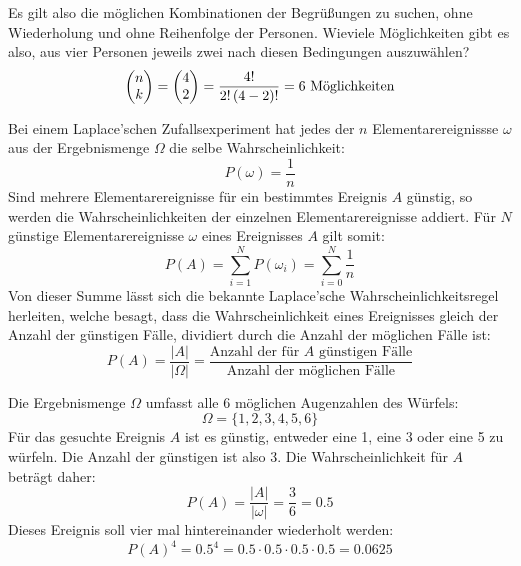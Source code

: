 Es gilt also die m\"{o}glichen Kombinationen der Begr\"{u}\ss{}ungen zu suchen, ohne Wiederholung und ohne Reihenfolge der Personen. Wieviele M\"{o}glichkeiten gibt es also, aus vier Personen jeweils zwei nach diesen Bedingungen auszuw\"{a}hlen? $$\begin{pmatrix}n \\ k\end{pmatrix} = \begin{pmatrix}4 \\ 2\end{pmatrix} = \frac{4!}{2! \, (4 - 2)!} = 6 \text{ M\"{o}glichkeiten}$$

\pagebreak


Bei einem Laplace'schen Zufallsexperiment hat jedes der $n$ Elementarereignissse $\omega$ aus der Ergebnismenge $\Omega$ die selbe Wahrscheinlichkeit: $$P(\omega) = \frac{1}{n}$$ Sind mehrere Elementarereignisse f\"{u}r ein bestimmtes Ereignis $A$ g\"{u}nstig, so werden die Wahrscheinlichkeiten der einzelnen Elementarereignisse addiert. F\"{u}r $N$ g\"{u}nstige Elementarereignisse $\omega$ eines Ereignisses $A$ gilt somit: $$P(A) = \sum_{i=1}^{N} P(\omega_i) = \sum_{i=0}^{N} \frac{1}{n}$$ Von dieser Summe l\"{a}sst sich die bekannte Laplace'sche Wahrscheinlichkeitsregel herleiten, welche besagt, dass die Wahrscheinlichkeit eines Ereignisses gleich der Anzahl der g\"{u}nstigen F\"{a}lle, dividiert durch die Anzahl der m\"{o}glichen F\"{a}lle ist: $$P(A) = \frac{|A|}{|\Omega|} = \frac{\text{Anzahl der f\"{u}r $A$ g\"{u}nstigen F\"{a}lle}}{\text{Anzahl der m\"{o}glichen F\"{a}lle}}$$


Die Ergebnismenge $\Omega$ umfasst alle 6 m\"{o}glichen Augenzahlen des W\"{u}rfels: $$\Omega = \{ 1, 2, 3, 4, 5, 6\}$$ F\"{u}r das gesuchte Ereignis $A$ ist es g\"{u}nstig, entweder eine 1, eine 3 oder eine 5 zu w\"{u}rfeln. Die Anzahl der g\"{u}nstigen ist also 3. Die Wahrscheinlichkeit f\"{u}r $A$ betr\"{a}gt daher: $$P(A) = \frac{|A|}{|\omega|} = \frac{3}{6} = 0.5$$ Dieses Ereignis soll vier mal hintereinander wiederholt werden: $$P(A)^4 = 0.5^4 = 0.5 \cdot 0.5 \cdot 0.5 \cdot 0.5 = 0.0625$$


